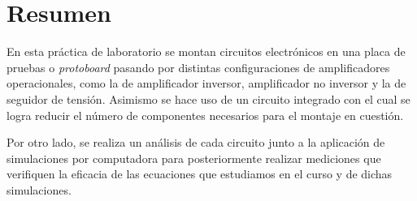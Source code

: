 \section{Resumen}

En esta práctica de laboratorio se montan circuitos electrónicos en una placa
de pruebas o \textit{protoboard} pasando por distintas configuraciones de
amplificadores operacionales, como la de amplificador inversor, amplificador no
inversor y la de seguidor de tensión. Asimismo se hace uso de un circuito
integrado con el cual se logra reducir el número de componentes necesarios
para el montaje en cuestión.



Por otro lado, se realiza un análisis de cada circuito junto a la
aplicación de simulaciones por computadora para posteriormente realizar
mediciones que verifiquen la eficacia de las ecuaciones que estudiamos
en el curso y de dichas simulaciones.

